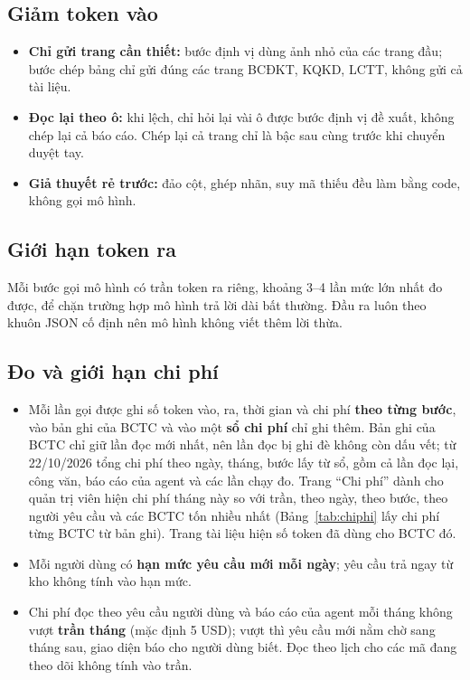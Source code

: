 \documentclass[12pt,a4paper]{report}
\newcommand{\enquote}[1]{“#1”}
\begin{document}
\subsection{Giảm token vào}
\begin{itemize}
  \item \textbf{Chỉ gửi trang cần thiết:} bước định vị dùng ảnh nhỏ của các trang đầu; bước chép bảng chỉ gửi đúng các
        trang BCĐKT, KQKD, LCTT, không gửi cả tài liệu.
  \item \textbf{Đọc lại theo ô:} khi lệch, chỉ hỏi lại vài ô được bước định vị đề xuất, không chép lại cả báo cáo.
        Chép lại cả trang chỉ là bậc sau cùng trước khi chuyển duyệt tay.
  \item \textbf{Giả thuyết rẻ trước:} đảo cột, ghép nhãn, suy mã thiếu đều làm bằng code, không gọi mô hình.
\end{itemize}

\subsection{Giới hạn token ra}
Mỗi bước gọi mô hình có trần token ra riêng, khoảng 3--4 lần mức lớn nhất đo được, để chặn trường hợp mô hình trả lời
dài bất thường. Đầu ra luôn theo khuôn JSON cố định nên mô hình không viết thêm lời thừa.

\subsection{Đo và giới hạn chi phí}
\begin{itemize}
  \item Mỗi lần gọi được ghi số token vào, ra, thời gian và chi phí \textbf{theo từng bước}, vào bản ghi của BCTC và
        vào một \textbf{sổ chi phí} chỉ ghi thêm. Bản ghi của BCTC chỉ giữ lần đọc mới nhất, nên lần đọc bị ghi đè không
        còn dấu vết; từ 22/10/2026 tổng chi phí theo ngày, tháng, bước lấy từ sổ, gồm cả lần đọc lại, công văn, báo cáo
        của agent và các lần chạy đo. Trang \enquote{Chi phí} dành cho quản trị viên hiện chi phí tháng này so với trần,
        theo ngày, theo bước, theo người yêu cầu và các BCTC tốn nhiều nhất (Bảng~\ref{tab:chiphi} lấy chi phí từng BCTC
        từ bản ghi). Trang tài liệu hiện số token đã dùng cho BCTC đó.
  \item Mỗi người dùng có \textbf{hạn mức yêu cầu mới mỗi ngày}; yêu cầu trả ngay từ kho không tính vào hạn mức.
  \item Chi phí đọc theo yêu cầu người dùng và báo cáo của agent mỗi tháng không vượt \textbf{trần tháng} (mặc định
        5 USD); vượt thì yêu cầu mới nằm chờ sang tháng sau, giao diện báo cho người dùng biết. Đọc theo lịch cho các mã
        đang theo dõi không tính vào trần.
\end{itemize}
\end{document}
